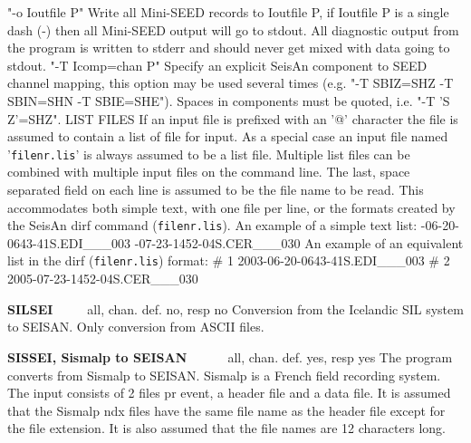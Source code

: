 "-o Ioutfile P" \newline
Write all Mini-SEED records to Ioutfile P, if Ioutfile P is a single dash (-) then all Mini-SEED output will go to stdout. All diagnostic output from the program is written to stderr and should never get mixed with data going to stdout. \newline
"-T Icomp=chan P" \newline
Specify an explicit SeisAn component to SEED channel mapping, this option may be used several times (e.g. "-T SBIZ=SHZ -T SBIN=SHN -T SBIE=SHE"). Spaces in components must be quoted, i.e. "-T 'S Z'=SHZ". \newline
LIST FILES \newline
If an input file is prefixed with an '@' character the file is assumed to contain a list of file for input. As a special case an input file named '\texttt{filenr.lis}' is always assumed to be a list file. Multiple list files can be combined with multiple input files on the command line. \newline
The last, space separated field on each line is assumed to be the file name to be read. This accommodates both simple text, with one file per line, or the formats created by the SeisAn dirf command (\texttt{filenr.lis}). \newline
An example of a simple text list: -06-20-0643-41S.EDI\_\_\_003 -07-23-1452-04S.CER\_\_\_030 \newline
An example of an equivalent list in the dirf (\texttt{filenr.lis}) format: \newline
\# 1 2003-06-20-0643-41S.EDI\_\_\_003 \newline
\# 2 2005-07-23-1452-04S.CER\_\_\_030 

\textbf{SILSEI} \verb|    |  all, chan. def. no, resp no\newline
{}
Conversion from the Icelandic SIL system to SEISAN. Only conversion from ASCII files. 

\textbf{SISSEI, Sismalp to SEISAN} \verb|     | all, chan. def. yes, resp yes\newline
The program converts from Sismalp to SEISAN. Sismalp is a French field recording system. The input consists of 2 files pr event, a header file and a data file. It is assumed that the Sismalp ndx files have the same file name as the header file except for the file extension. It is also assumed that the file names are 12 characters long.  

